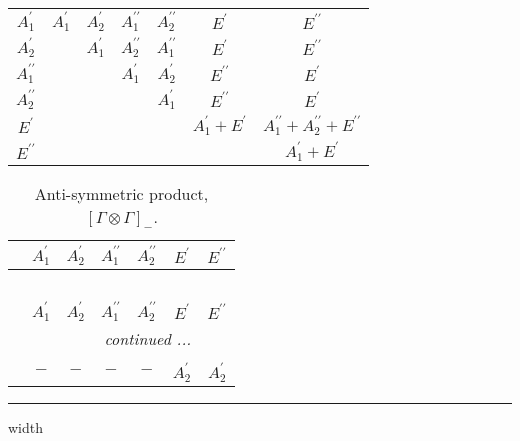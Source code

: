 \documentclass[fleqn,10pt,landscape]{article}
\begin{document}
\begin{itemize}
\begin{center}
\begin{longtable}{c|cccccc}
$ A_{1}^{\prime} $ & $ A_{1}^{\prime} $ & $ A_{2}^{\prime} $ & $ A_{1}^{\prime\prime} $ & $ A_{2}^{\prime\prime} $ & $ E^{\prime} $ & $ E^{\prime\prime} $ \\
$ A_{2}^{\prime} $ & $  $ & $ A_{1}^{\prime} $ & $ A_{2}^{\prime\prime} $ & $ A_{1}^{\prime\prime} $ & $ E^{\prime} $ & $ E^{\prime\prime} $ \\
$ A_{1}^{\prime\prime} $ & $  $ & $  $ & $ A_{1}^{\prime} $ & $ A_{2}^{\prime} $ & $ E^{\prime\prime} $ & $ E^{\prime} $ \\
$ A_{2}^{\prime\prime} $ & $  $ & $  $ & $  $ & $ A_{1}^{\prime} $ & $ E^{\prime\prime} $ & $ E^{\prime} $ \\
$ E^{\prime} $ & $  $ & $  $ & $  $ & $  $ & $ A_{1}^{\prime} + E^{\prime} $ & $ A_{1}^{\prime\prime} + A_{2}^{\prime\prime} + E^{\prime\prime} $ \\
$ E^{\prime\prime} $ & $  $ & $  $ & $  $ & $  $ & $  $ & $ A_{1}^{\prime} + E^{\prime} $ \\
\end{longtable}
\end{center}
\begin{center}
\renewcommand{\arraystretch}{1.0}
\begin{longtable}{ccccccc}
\caption{Anti-symmetric product, $[\Gamma\otimes\Gamma]_-$.}
 \\
 \hline \hline
 & $ A_{1}^{\prime} $ & $ A_{2}^{\prime} $ & $ A_{1}^{\prime\prime} $ & $ A_{2}^{\prime\prime} $ & $ E^{\prime} $ & $ E^{\prime\prime} $ \\ \hline \endfirsthead

\multicolumn{6}{l}{\tablename\ \thetable{}} \\
 \hline \hline
 & $ A_{1}^{\prime} $ & $ A_{2}^{\prime} $ & $ A_{1}^{\prime\prime} $ & $ A_{2}^{\prime\prime} $ & $ E^{\prime} $ & $ E^{\prime\prime} $ \\ \hline \endhead

 \hline \hline
\multicolumn{6}{r}{\footnotesize\it continued ...} \\ \endfoot

 \hline \hline
\multicolumn{6}{r}{} \\ \endlastfoot

$  $ & $ - $ & $ - $ & $ - $ & $ - $ & $ A_{2}^{\prime} $ & $ A_{2}^{\prime} $ \\
\end{longtable}
\end{center}

 \hfil \hrule height 1mm width \textwidth \hfil


\end{itemize}
\end{document}
